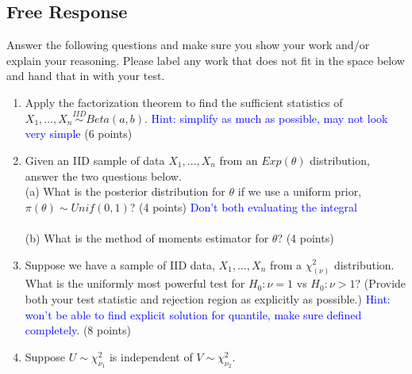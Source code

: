 \documentclass[12pt]{article}
\begin{document}
\subsection{Free Response}
Answer the following questions and make sure you show your work and/or explain your reasoning. Please label any work that does not fit in the space below and hand that in with your test. 
\begin{enumerate}[leftmargin=\labelsep]
\item Apply the factorization theorem to find the sufficient statistics of $X_1, \dots, X_n \stackrel{IID}{\sim} Beta(a, b)$. \textcolor{blue}{Hint: simplify as much as possible, may not look very simple} (6 points)
\pagebreak 

\item Given an IID sample of data $X_1, \dots, X_n$ from an $Exp(\theta)$ distribution, answer the two questions below.\\

(a) What is the posterior distribution for $\theta$ if we use a uniform prior, $\pi(\theta) \sim Unif(0,1)$? (4 points) \textcolor{blue}{Don't both evaluating the integral}\\
\vspace{5in}\\
(b) What is the method of moments estimator for $\theta$? (4 points)\\
\pagebreak 


\item Suppose we have a sample of IID data, $X_1, \dots, X_n$ from a $\chi^2_{(\nu)}$ distribution. What is the uniformly most powerful test for $H_0: \nu = 1$ vs $H_0: \nu >1$? (Provide both your test statistic and rejection region as explicitly as possible.) \textcolor{blue}{Hint: won't be able to find explicit solution for quantile, make sure defined completely. }(8 points)\\
\pagebreak 

\item Suppose $U \sim \chi^2_{\nu_1}$ is independent of $V \sim \chi^2_{\nu_2}$.\\


\end{enumerate}
\end{document}

